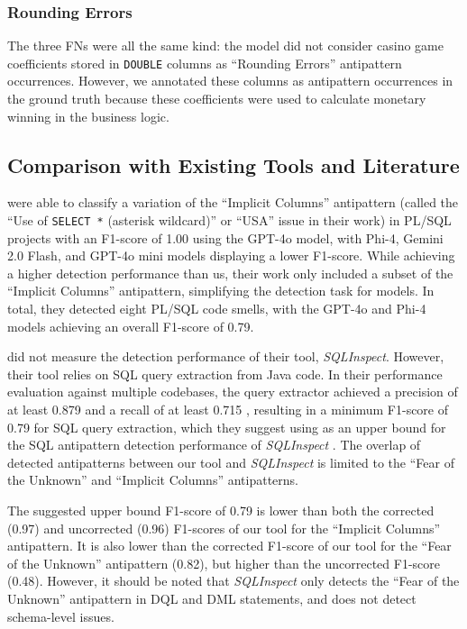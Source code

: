 \subsubsection*{Rounding Errors}
The three FNs were all the same kind: the model did not consider casino game coefficients stored in \texttt{DOUBLE} columns as “Rounding Errors” antipattern occurrences. However, we annotated these columns as antipattern occurrences in the ground truth because these coefficients were used to calculate monetary winning in the business logic.

\subsection{Comparison with Existing Tools and Literature}\label{sec:comparison}

 were able to classify a variation of the “Implicit Columns” antipattern (called the “Use of \texttt{SELECT *} (asterisk wildcard)” or “USA” issue in their work) in PL/SQL projects with an F1-score of \num{1.00} using the GPT-4o model, with Phi-4, Gemini 2.0 Flash, and GPT-4o mini models displaying a lower F1-score. While achieving a higher detection performance than us, their work only included a subset of the “Implicit Columns” antipattern, simplifying the detection task for models. In total, they detected eight PL/SQL code smells, with the GPT-4o and Phi-4 models achieving an overall F1-score of \num{0.79}.

 did not measure the detection performance of their tool, \emph{SQLInspect}. However, their tool relies on SQL query extraction from Java code. In their performance evaluation against multiple codebases, the query extractor achieved a precision of at least \num{0.879} and a recall of at least \num{0.715} , resulting in a minimum F1-score of \num{0.79} for SQL query extraction, which they suggest using as an upper bound for the SQL antipattern detection performance of \emph{SQLInspect} . The overlap of detected antipatterns between our tool and \emph{SQLInspect} is limited to the “Fear of the Unknown” and “Implicit Columns” antipatterns. 

The suggested upper bound F1-score of \num{0.79} is lower than both the corrected (\num{0.97}) and uncorrected (\num{0.96}) F1-scores of our tool for the “Implicit Columns” antipattern. It is also lower than the corrected F1-score of our tool for the “Fear of the Unknown” antipattern (\num{0.82}), but higher than the uncorrected F1-score (\num{0.48}). However, it should be noted that \emph{SQLInspect} only detects the “Fear of the Unknown” antipattern in DQL and DML statements, and does not detect schema-level issues.

